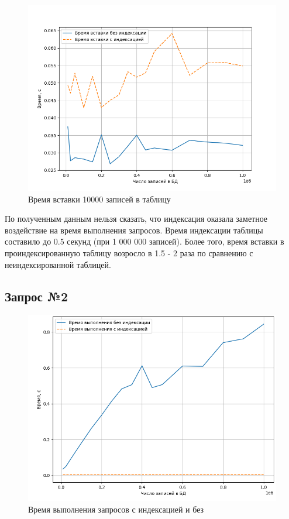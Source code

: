 \begin{figure}[H]
	\begin{center}
		\includegraphics[page=1,scale=0.8]{assets/insertion_time.png}
	\end{center}
	\caption{Время вставки 10000 записей в таблицу}
	\label{insertion_time}
\end{figure}

По полученным данным нельзя сказать, что индексация оказала заметное воздействие на время выполнения запросов. Время индексации таблицы составило до 0.5 секунд (при 1 000 000 записей). Более того, время вставки в проиндексированную таблицу возросло в 1.5 - 2 раза по сравнению с неиндексированной таблицей.

\subsection{Запрос №2}

\begin{figure}[H]
	\begin{center}
		\includegraphics[page=1,scale=0.8]{assets/indexing_both_username.png}
	\end{center}
	\caption{Время выполнения запросов с индексацией и без}
	\label{indexing_both_username}
\end{figure}

